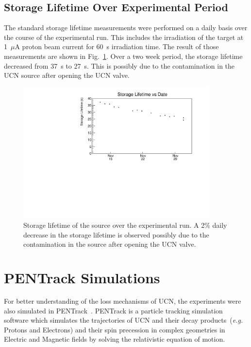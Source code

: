 \subsection{Storage Lifetime Over Experimental Period\label{sec:storage_overall}}

The standard storage lifetime measurements were performed on a daily
basis over the course of the experimental run. This includes the
irradiation of the target at 1~$\mu$A proton beam current for 60~s
irradiation time. The result of those measurements are shown in
Fig.~\ref{fig:storagelifetime_overall}. Over a two week period, the
storage lifetime decreased from 37~s to 27~s. This is possibly due to
the contamination in the UCN source after opening the UCN valve.


\begin{figure}[h!]
  \centering
  \includegraphics[width=0.9\textwidth]{storageLifetime_vs_time.pdf}
  \caption{Storage lifetime of the source over the experimental run. A
    2\% daily decrease in the storage lifetime is observed possibly
    due to the contamination in the source after opening the UCN
    valve.}
  \label{fig:storagelifetime_overall}
\end{figure}



\section{PENTrack Simulations\label{sec:pentrack}}

For better understanding of the loss mechanisms of UCN, the
experiments were also simulated in
PENTrack~\cite{schreyer2017pentrack}. PENTrack is a particle tracking
simulation software which simulates the trajectories of UCN and their
decay products~({\it{e.g.}} Protons and Electrons) and their spin
precession in complex geometries in Electric and Magnetic fields by
solving the relativistic equation of motion.

